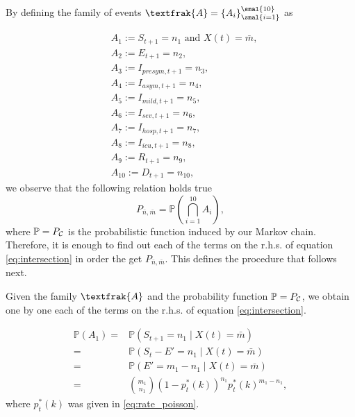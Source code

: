\documentclass[a4paper]{article}
\theoremstyle{remark}
\begin{document}
\medskip
\noindent
By defining the family of events $\textfrak{A}=\{A_i\}_{\smal{i=1}}^{\smal{10}}$ as

\begin{equation*}
\begin{split}
&A_1:=S_{t+1}=n_1 \mbox{ and } X(t)=\bar{m},\\
&A_2:=E_{t+1}=n_2,\\ 
&A_3:=I_{presym,t+1}=n_3,\\ 
&A_4:=I_{asym,t+1}=n_4,\\
&A_5:=I_{mild,t+1}=n_5,\\ 
&A_6:=I_{sev,t+1}=n_6,\\ 
&A_7:=I_{hosp,t+1}=n_7,\\ 
&A_8:=I_{icu,t+1}=n_8,\\
&A_9:=R_{t+1}=n_9,\\ 
&A_{10}:=D_{t+1}=n_{10},
\end{split}
\end{equation*}
%
we observe that the following relation holds true
\[P_{\bar{n},\bar{m}}=\mathbb{P}\left( \bigcap_{i=1}^{10}A_{i}\right),\]
where $\mathbb{P}=P_{\scriptsize{\mathcal{C}}}$ is the probabilistic function induced by our Markov chain. Therefore, it is enough to find out each of the terms on the r.h.s. of equation \eqref{eq:intersection} in order the get $P_{\bar{n},\bar{m}}$. This defines the procedure that follows next.

\medskip
Given the family $\textfrak{A}$ and the probability function $\mathbb{P}=P_{\scriptsize{\mathcal{C}}}$, we obtain one by one each of the terms on the r.h.s. of equation \eqref{eq:intersection}. 



\begin{align*}
   \mathbb{P}(A_{1})=&\mathbb{P}(S_{t+1}=n_1\mid X(t)=\bar{m}) \\
   =& \mathbb{P}(S_{t}-E'=n_1\mid X(t)=\bar{m}) \\
   =& \mathbb{P}(E'=m_1-n_1\mid X(t)=\bar{m}) \\
   =& {m_1 \choose n_1}(1-p_t^*(k))^{n_1}p_t^{*}(k)^{m_1-n_1},
\end{align*}
where $p_t^*(k)$ was given in \eqref{eq:rate_poisson}.


\end{document}

